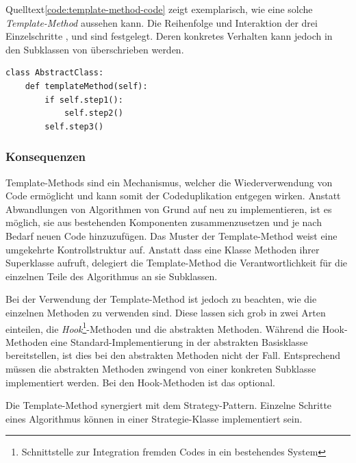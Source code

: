 Quelltext\ref{code:template-method-code} zeigt exemplarisch, wie eine solche \emph{Template-Method} aussehen kann. Die Reihenfolge und Interaktion der drei Einzelschritte ,  und  sind festgelegt. Deren konkretes Verhalten kann jedoch in den Subklassen von  überschrieben werden.

\lstset{language=python}
\begin{lstlisting}[caption={Exemplarische Implementierung einer Template-Method}, label=code:template-method-code]
class AbstractClass:
	def templateMethod(self):
    	if self.step1():
        	self.step2()
    	self.step3()
\end{lstlisting}


\subsubsection*{Konsequenzen}

Template-Methods sind ein Mechanismus, welcher die Wiederverwendung von Code ermöglicht und kann somit der Codeduplikation entgegen wirken. Anstatt Abwandlungen von Algorithmen von Grund auf neu zu implementieren, ist es möglich, sie aus bestehenden Komponenten zusammenzusetzen und je nach Bedarf neuen Code hinzuzufügen. Das Muster der Template-Method weist eine umgekehrte Kontrollstruktur auf. Anstatt dass eine Klasse Methoden ihrer Superklasse aufruft, delegiert die Template-Method die Verantwortlichkeit für die einzelnen Teile des Algorithmus an sie Subklassen.

Bei der Verwendung der Template-Method ist jedoch zu beachten, wie die einzelnen Methoden zu verwenden sind. Diese lassen sich grob in zwei Arten einteilen, die \emph{Hook}\footnote{Schnittstelle zur Integration fremden Codes in ein bestehendes System}-Methoden und die abstrakten Methoden. Während die Hook-Methoden eine Standard-Implementierung in der abstrakten Basisklasse bereitstellen, ist dies bei den abstrakten Methoden nicht der Fall. Entsprechend müssen die abstrakten Methoden zwingend von einer konkreten Subklasse implementiert werden. Bei den Hook-Methoden ist das optional.

Die Template-Method synergiert mit dem Strategy-Pattern. Einzelne Schritte eines Algorithmus können in einer Strategie-Klasse implementiert sein. \cite{gamma_design_1995}